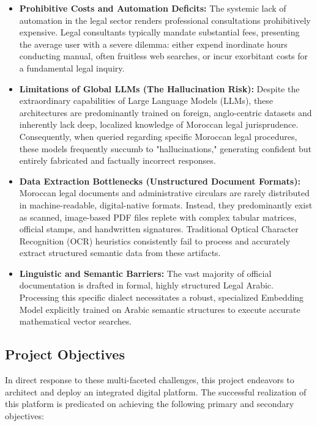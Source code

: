 \begin{itemize}
    \item \textbf{Prohibitive Costs and Automation Deficits:} The systemic lack of automation in the legal sector renders professional consultations prohibitively expensive. Legal consultants typically mandate substantial fees, presenting the average user with a severe dilemma: either expend inordinate hours conducting manual, often fruitless web searches, or incur exorbitant costs for a fundamental legal inquiry.
    
    \item \textbf{Limitations of Global LLMs (The Hallucination Risk):} Despite the extraordinary capabilities of Large Language Models (LLMs), these architectures are predominantly trained on foreign, anglo-centric datasets and inherently lack deep, localized knowledge of Moroccan legal jurisprudence. Consequently, when queried regarding specific Moroccan legal procedures, these models frequently succumb to "hallucinations," generating confident but entirely fabricated and factually incorrect responses.
    
    \item \textbf{Data Extraction Bottlenecks (Unstructured Document Formats):} Moroccan legal documents and administrative circulars are rarely distributed in machine-readable, digital-native formats. Instead, they predominantly exist as scanned, image-based PDF files replete with complex tabular matrices, official stamps, and handwritten signatures. Traditional Optical Character Recognition (OCR) heuristics consistently fail to process and accurately extract structured semantic data from these artifacts.
    
    \item \textbf{Linguistic and Semantic Barriers:} The vast majority of official documentation is drafted in formal, highly structured Legal Arabic. Processing this specific dialect necessitates a robust, specialized Embedding Model explicitly trained on Arabic semantic structures to execute accurate mathematical vector searches.
\end{itemize}

\subsection{Project Objectives}
In direct response to these multi-faceted challenges, this project endeavors to architect and deploy an integrated digital platform. The successful realization of this platform is predicated on achieving the following primary and secondary objectives:


